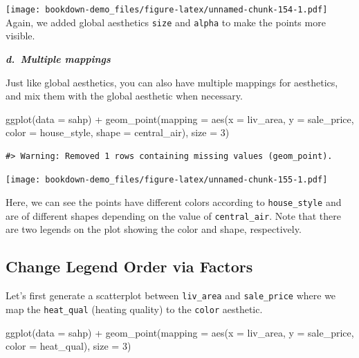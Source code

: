 \documentclass[
]{book}
\newenvironment{Shaded}{\begin{snugshade}}{\end{snugshade}}
\newcommand{\AttributeTok}[1]{\textcolor[rgb]{0.77,0.63,0.00}{#1}}
\newcommand{\DecValTok}[1]{\textcolor[rgb]{0.00,0.00,0.81}{#1}}
\newcommand{\FunctionTok}[1]{\textcolor[rgb]{0.00,0.00,0.00}{#1}}
\newcommand{\NormalTok}[1]{#1}
\newcommand{\SpecialCharTok}[1]{\textcolor[rgb]{0.00,0.00,0.00}{#1}}
\begin{document}
\texttt{[image: bookdown-demo\_files/figure-latex/unnamed-chunk-154-1.pdf]}
Again, we added global aesthetics \texttt{size} and \texttt{alpha} to make the points more visible.

\textbf{\emph{d.~Multiple mappings}}

Just like global aesthetics, you can also have multiple mappings for aesthetics, and mix them with the global aesthetic when necessary.

\begin{Shaded}
\begin{Highlighting}[]
\FunctionTok{ggplot}\NormalTok{(}\AttributeTok{data =}\NormalTok{ sahp) }\SpecialCharTok{+} \FunctionTok{geom\_point}\NormalTok{(}\AttributeTok{mapping =} \FunctionTok{aes}\NormalTok{(}\AttributeTok{x =}\NormalTok{ liv\_area, }\AttributeTok{y =}\NormalTok{ sale\_price, }\AttributeTok{color =}\NormalTok{ house\_style, }\AttributeTok{shape =}\NormalTok{ central\_air), }\AttributeTok{size =} \DecValTok{3}\NormalTok{)}
\end{Highlighting}
\end{Shaded}

\begin{verbatim}
#> Warning: Removed 1 rows containing missing values (geom_point).
\end{verbatim}

\texttt{[image: bookdown-demo\_files/figure-latex/unnamed-chunk-155-1.pdf]}

Here, we can see the points have different colors according to \texttt{house\_style} and are of different shapes depending on the value of \texttt{central\_air}. Note that there are two legends on the plot showing the color and shape, respectively.

\hypertarget{change-legend-order-via-factors}{%
\subsection{Change Legend Order via Factors}\label{change-legend-order-via-factors}}

Let's first generate a scatterplot between \texttt{liv\_area} and \texttt{sale\_price} where we map the \texttt{heat\_qual} (heating quality) to the \texttt{color} aesthetic.

\begin{Shaded}
\begin{Highlighting}[]
\FunctionTok{ggplot}\NormalTok{(}\AttributeTok{data =}\NormalTok{ sahp) }\SpecialCharTok{+} \FunctionTok{geom\_point}\NormalTok{(}\AttributeTok{mapping =} \FunctionTok{aes}\NormalTok{(}\AttributeTok{x =}\NormalTok{ liv\_area, }\AttributeTok{y =}\NormalTok{ sale\_price, }\AttributeTok{color =}\NormalTok{ heat\_qual), }\AttributeTok{size =} \DecValTok{3}\NormalTok{)}
\end{Highlighting}
\end{Shaded}
\end{document}
